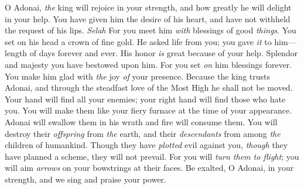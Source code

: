 \begin{biblechapter} %
 O Adonai, \textit{the} king will rejoice in your strength, 
and how greatly he will delight in your help.
\verse You have given him the desire of his heart, 
and have not withheld the request of his lips. \textit{Selah}
\verse For you meet him \textit{with} blessings of good \textit{things}. 
You set on his head a crown of fine gold.
\verse He asked life from you; you gave \textit{it} to him— 
length of days forever and ever.
\verse His honor \textit{is} great because of your help. 
Splendor and majesty you have bestowed upon him.
\verse For you set \textit{on} him blessings forever. 
You make him glad with \textit{the} joy \textit{of} your presence.
\verse Because the king trusts Adonai, 
and through the steadfast love of the Most High 
he shall not be moved.
\verse Your hand will find all your enemies; 
your right hand will find those who hate you.
\verse You will make them like your fiery furnace 
at the time of your appearance. 
Adonai will swallow them in his wrath 
and fire will consume them.
\verse You will destroy their \textit{offspring} from \textit{the} earth, 
and their \textit{descendants} from among \textit{the} children of humankind.
\verse Though they have \textit{plotted} evil against you, 
\textit{though} they have planned a scheme, they will not prevail.
\verse For you will \textit{turn them to flight}; 
you will aim \textit{arrows} on your bowstrings at their faces.
\verse Be exalted, O Adonai, in your strength, 
and we sing and praise your power.
\end{biblechapter}

